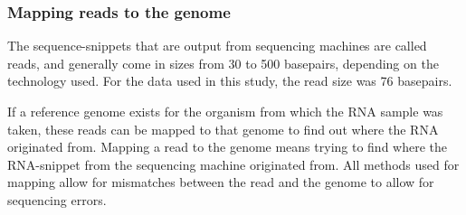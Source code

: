 \subsubsection{Mapping reads to the genome}
The sequence-snippets that are output from sequencing machines are called
reads, and generally come in sizes from 30 to 500 basepairs, depending on the
technology used. For the data used in this study, the read size was 76
basepairs.

If a reference genome exists for the organism from which the RNA sample was
taken, these reads can be mapped to that genome to find out where the RNA
originated from. Mapping a read to the genome means trying to find where the
RNA-snippet from the sequencing machine originated from. All methods used for
mapping allow for mismatches between the read and the genome to allow for
sequencing errors. 
